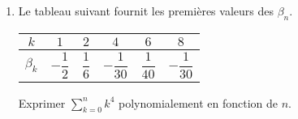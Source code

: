 \begin{enumerate}
  \item Le tableau suivant fournit les premières valeurs des $\beta_n$.
{
\renewcommand{\arraystretch}{2.2}
\begin{center}
\begin{tabular}{|c|c|c|c|c|c|}\hline
$k$       & $1$            & $2$           & $4$             & $6$            & $8$ \\ \hline
$\beta_k$ & $-\dfrac{1}{2}$ & $\dfrac{1}{6}$ & $-\dfrac{1}{30}$ & $\dfrac{1}{40}$ & $-\dfrac{1}{30}$ \\ \hline
\end{tabular}
\end{center}
}%
Exprimer $\sum_{k=0}^{n}k^{4}$ polynomialement en fonction de $n$.  

\end{enumerate}

